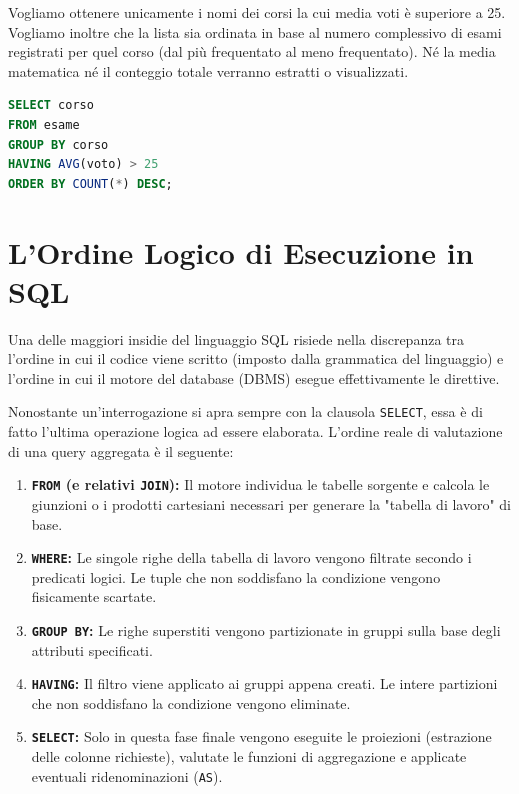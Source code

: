 \begin{example}
Vogliamo ottenere unicamente i nomi dei corsi la cui media voti è superiore a 25. Vogliamo inoltre che la lista sia ordinata in base al numero complessivo di esami registrati per quel corso (dal più frequentato al meno frequentato). Né la media matematica né il conteggio totale verranno estratti o visualizzati.

\begin{lstlisting}[language=SQL, basicstyle=\ttfamily\small, keywordstyle=\color{blue}\bfseries]
SELECT corso
FROM esame
GROUP BY corso
HAVING AVG(voto) > 25
ORDER BY COUNT(*) DESC;
\end{lstlisting}
\end{example}


\section{L'Ordine Logico di Esecuzione in SQL}

Una delle maggiori insidie del linguaggio SQL risiede nella discrepanza tra l'ordine in cui il codice viene scritto (imposto dalla grammatica del linguaggio) e l'ordine in cui il motore del database (DBMS) esegue effettivamente le direttive. 

Nonostante un'interrogazione si apra sempre con la clausola \texttt{SELECT}, essa è di fatto l'ultima operazione logica ad essere elaborata. L'ordine reale di valutazione di una query aggregata è il seguente:

\begin{enumerate}
    \item \textbf{\texttt{FROM} (e relativi \texttt{JOIN}):} Il motore individua le tabelle sorgente e calcola le giunzioni o i prodotti cartesiani necessari per generare la "tabella di lavoro" di base.
    \item \textbf{\texttt{WHERE}:} Le singole righe della tabella di lavoro vengono filtrate secondo i predicati logici. Le tuple che non soddisfano la condizione vengono fisicamente scartate.
    \item \textbf{\texttt{GROUP BY}:} Le righe superstiti vengono partizionate in gruppi sulla base degli attributi specificati.
    \item \textbf{\texttt{HAVING}:} Il filtro viene applicato ai gruppi appena creati. Le intere partizioni che non soddisfano la condizione vengono eliminate.
    \item \textbf{\texttt{SELECT}:} Solo in questa fase finale vengono eseguite le proiezioni (estrazione delle colonne richieste), valutate le funzioni di aggregazione e applicate eventuali ridenominazioni (\texttt{AS}).
\end{enumerate}

